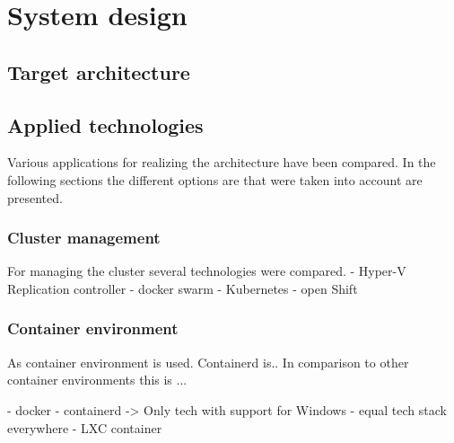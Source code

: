 \chapter{System design} %

\label{chap:design} %



\section{Target architecture}


\section{Applied technologies}
Various applications for realizing the architecture have been compared. In the following sections the different options are that were taken into account are presented.


\subsection{Cluster management}
For managing the cluster several technologies were compared. 
- Hyper-V Replication controller
- docker swarm
- Kubernetes
- open Shift


\subsection{Container environment}
As container environment  is used. Containerd is..
In comparison to other container environments this is ...

- docker
- containerd -> Only tech with support for Windows - equal tech stack everywhere
- LXC container
